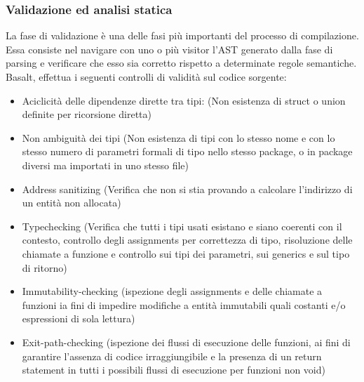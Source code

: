 \subsubsection{Validazione ed analisi statica}
La fase di validazione è una delle fasi più importanti del processo di compilazione. Essa consiste 
nel navigare con uno o più visitor l'AST generato dalla fase di parsing e verificare che esso sia
corretto rispetto a determinate regole semantiche. \\

Basalt, effettua i seguenti controlli di validità sul codice sorgente:
\begin{itemize}
    \item Aciclicità delle dipendenze dirette tra tipi: (Non esistenza di struct o union definite per ricorsione diretta)
    
    \item Non ambiguità dei tipi (Non esistenza di tipi con lo stesso nome e con lo stesso numero di parametri 
    formali di tipo nello stesso package, o in package diversi ma importati in uno stesso file)

    \item Address sanitizing (Verifica che non si stia provando a calcolare l'indirizzo di un entità non allocata)

    \item Typechecking (Verifica che tutti i tipi usati esistano e siano coerenti con il contesto, controllo degli 
    assignments per correttezza di tipo, risoluzione delle chiamate a funzione e controllo sui tipi dei parametri, sui 
    generics e sul tipo di ritorno)

    \item Immutability-checking (ispezione degli assignments e delle chiamate a funzioni ia fini di impedire
    modifiche a entità immutabili quali costanti e/o espressioni di sola lettura)

    \item Exit-path-checking (ispezione dei flussi di esecuzione delle funzioni, ai fini di garantire l'assenza di 
    codice irraggiungibile e la presenza di un return statement in tutti i possibili flussi di esecuzione per funzioni 
    non void)
\end{itemize}